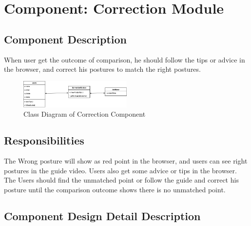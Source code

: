 \documentclass[16pt]{scrreprt}
\begin{document}
\section{Component: Correction Module}
\subsection{Component Description}
When user get the outcome of comparison, he should follow the tips or advice in the browser, and correct his postures to match the right postures.

\begin{figure}[H]
    \centering
    \includegraphics[width=0.5\textwidth]{diagrams/class-correction.png}
    \caption{Class Diagram of Correction Component}
\end{figure}

\subsection{Responsibilities}
The Wrong posture will show as red point in the browser, and users can see right postures in the guide video. Users also get some advice or tips in the browser.\\ 
The Users should find the unmatched point or follow the guide and correct his posture until the comparison outcome shows there is no unmatched point.

\subsection{Component Design Detail Description}
\end{document}
